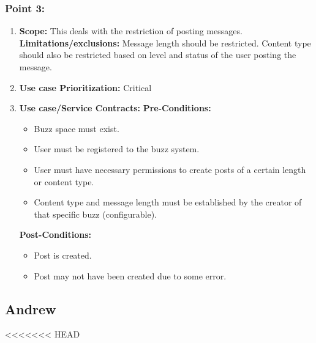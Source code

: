 \documentclass[11pt]{article}
\begin{document}
\subsubsection{Point 3:} 
\begin{enumerate}
\item 
\textbf{Scope:}
This deals with the restriction of posting messages.
\newline
\textbf{Limitations/exclusions:} 
Message length should be restricted. Content type should also be restricted based on level and status of the user posting the message.

\item 
\textbf{Use case Prioritization:} Critical

\item 
\textbf{Use case/Service Contracts:} 
\newline
\textbf{Pre-Conditions: }
\begin{itemize}
\item Buzz space must exist.
\item User must be registered to the buzz system.
\item User must have necessary permissions to create posts of a certain length or content type.
\item Content type and message length must be established by the creator of that specific buzz (configurable).
\end{itemize}
 

\textbf{Post-Conditions: }
\begin{itemize}
\item Post is created.
\item Post may not have been created due to some error.
\end{itemize}
\end{enumerate}

\newpage

\subsection{Andrew}
<<<<<<< HEAD
\end{document}
